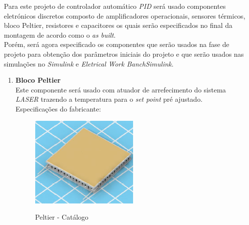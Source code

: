 Para este projeto de controlador automático \emph{PID} será usado componentes eletrónicos discretos composto de amplificadores operacionais, sensores térmicos, bloco Peltier, resistores e capacitores os quais serão especificados no final da montagem de acordo como o \emph{as built}.\\
Porém, será agora especificado os componentes que serão usados na fase de projeto para obtenção dos parâmetros iniciais do projeto e que serão usados nas simulações no \emph{Simulink\tiny\textregistered} e \emph{Eletrical Work BanchSimulink\tiny\textregistered}.\\
\begin{enumerate}
\item \textbf{Bloco Peltier}\\
Este componente será usado com atuador de arrefecimento do sistema \emph{LASER} trazendo a temperatura para o \emph{set point} pré ajustado.\\
 Especificações do fabricante:
 
 
\begin{minipage}{0.5\linewidth}
\begin{figure}[H]
		\centering
		\includegraphics[width=0.4\linewidth]{./ima/peltiercatalogo01.png}
		\label{fig:Ppeltier02}
		\caption{Peltier - Catálogo}
	\end{figure}

\end{minipage} 


\end{enumerate}
